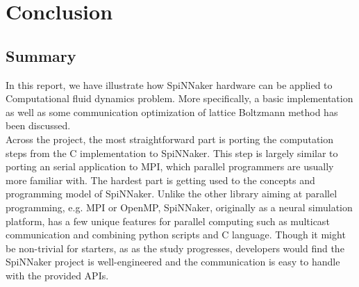 \section{Conclusion} \label{sec:conclusion}
\subsection{Summary} \label{sec:summary}




In this report, we have illustrate how SpiNNaker hardware can be applied to Computational fluid dynamics problem. More specifically, a basic implementation as well as some communication optimization of lattice Boltzmann method has been discussed. \\

Across the project, the most straightforward part is porting the computation steps from the C implementation to SpiNNaker. This step is largely similar to porting an serial application to MPI, which parallel programmers are usually more familiar with. The hardest part is getting used to the concepts and programming model of SpiNNaker. Unlike the other library aiming at parallel programming, e.g. MPI or OpenMP, SpiNNaker, originally as a neural simulation platform, has a few unique features for parallel computing such as multicast communication and combining python scripts and C language. Though it might be non-trivial for starters, as as the study progresses, developers would find the SpiNNaker project is well-engineered and the communication is easy to handle with the provided APIs.\\

